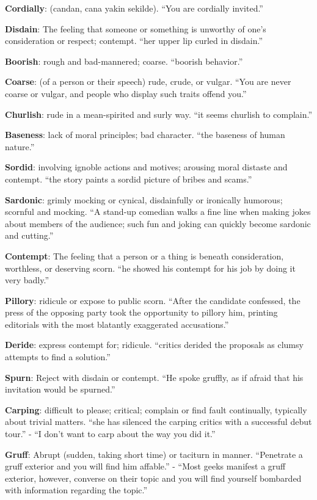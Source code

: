\documentclass[12pt, a4paper]{ximera}
\begin{document}
\textbf{Cordially}: (candan, cana yakin sekilde). ``You are cordially invited.''

\textbf{Disdain}: The feeling that someone or something is unworthy of one's consideration or respect; contempt. ``her upper lip curled in disdain.''

\textbf{Boorish}: rough and bad-mannered; coarse. ``boorish behavior.''

\textbf{Coarse}: (of a person or their speech) rude, crude, or vulgar. ``You are never coarse or vulgar, and people who display such traits offend you.''

\textbf{Churlish}: rude in a mean-spirited and surly way. ``it seems churlish to complain.''

\textbf{Baseness}: lack of moral principles; bad character. ``the baseness of human nature.''

\textbf{Sordid}: involving ignoble actions and motives; arousing moral distaste and contempt. ``the story paints a sordid picture of bribes and scams.''

\textbf{Sardonic}: grimly mocking or cynical, disdainfully or ironically humorous; scornful and mocking. ``A stand-up comedian walks a fine line when making jokes about members of the audience; such fun and joking can quickly become sardonic and cutting.''

\textbf{Contempt}: The feeling that a person or a thing is beneath consideration, worthless, or deserving scorn. ``he showed his contempt for his job by doing it very badly.''

\textbf{Pillory}: ridicule or expose to public scorn. ``After the candidate confessed, the press of the opposing party took the opportunity to pillory him, printing editorials with the most blatantly exaggerated accusations.''

\textbf{Deride}: express contempt for; ridicule. ``critics derided the proposals as clumsy attempts to find a solution.''

\textbf{Spurn}: Reject with disdain or contempt. ``He spoke gruffly, as if afraid that his invitation would be spurned.''

\textbf{Carping}: difficult to please; critical; complain or find fault continually, typically about trivial matters. ``she has silenced the carping critics with a successful debut tour.'' - ``I don't want to carp about the way you did it.''

\textbf{Gruff}: Abrupt (sudden, taking short time) or taciturn in manner. ``Penetrate a gruff exterior and you will find him affable.'' - ``Most geeks manifest a gruff exterior, however, converse on their topic and you will find yourself bombarded with information regarding the topic.''
\end{document}
